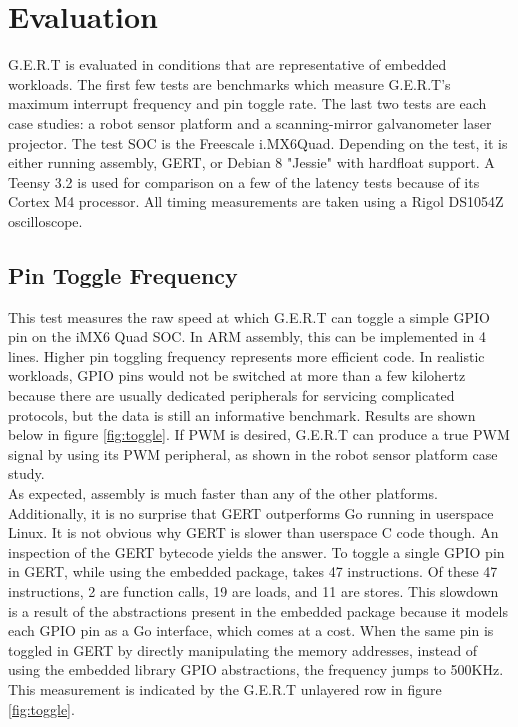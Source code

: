 \chapter{Evaluation}

G.E.R.T is evaluated in conditions that are representative of embedded workloads.
The first few tests are benchmarks which measure G.E.R.T's maximum interrupt
frequency and pin toggle rate. The last two tests are each case studies: a robot
sensor platform and a scanning-mirror galvanometer laser projector. The test SOC
is the Freescale i.MX6Quad. Depending on the test, it is either running assembly,
GERT, or Debian 8 "Jessie" with hardfloat support. A Teensy 3.2 is used for comparison
on a few of the latency tests because of its Cortex M4 processor. All timing
measurements are taken using a Rigol DS1054Z oscilloscope.

\section{Pin Toggle Frequency}
This test measures the raw speed at which G.E.R.T can toggle a simple GPIO pin on
the iMX6 Quad SOC. In ARM assembly, this can be implemented in 4 lines. Higher pin
toggling frequency represents more efficient code. In realistic workloads, GPIO pins
would not be switched at more than a few kilohertz because there are usually dedicated
peripherals for servicing complicated protocols, but the data is still an informative
benchmark. Results are shown below in figure \ref{fig:toggle}. If PWM is desired,
G.E.R.T can produce a true PWM signal by using its PWM peripheral, as shown
in the robot sensor platform case study. \\

As expected, assembly is much faster than any of the other platforms. Additionally,
it is no surprise that GERT outperforms Go running in userspace Linux. It is not obvious
why GERT is slower than userspace C code though. An inspection of the GERT bytecode
yields the answer. To toggle a single GPIO pin in GERT, while using the embedded package,
takes 47 instructions. Of these 47 instructions, 2 are function calls, 19 are loads, and 11
are stores. This slowdown is a result of the abstractions present in the embedded package because
it models each GPIO pin as a Go interface, which comes at a cost.
When the same pin is toggled in GERT by directly manipulating the memory addresses,
instead of using the embedded library GPIO abstractions, the
frequency jumps to 500KHz. This measurement is indicated by the G.E.R.T unlayered row
in figure \ref{fig:toggle}.

